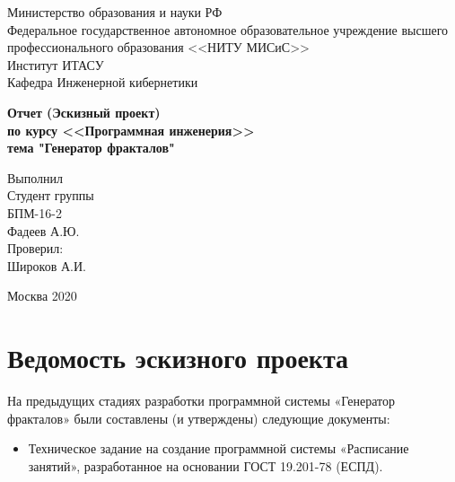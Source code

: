 \documentclass[a4paper,12pt,preview]{report} %
\begin{document}
	
	\begin{center}
		Министерство образования и науки РФ \\
		Федеральное государственное автономное образовательное учреждение высшего профессионального образования <<НИТУ МИСиС>>\\
		Институт ИТАСУ\\
		Кафедра Инженерной кибернетики\\
	\end{center}
	
	
	\vfill
	
	\begin{center}
		\Large\textbf{Отчет  (Эскизный проект) \\
			по курсу <<Программная инженерия>>\\
			тема "Генератор фракталов"}
	\end{center}
	
	\vfill
	
	\begin{FlushRight}
		Выполнил\\
		Студент группы \\
		БПМ-16-2 \\
		Фадеев А.Ю. \\
		[\baselineskip]
		Проверил: \\
		Широков А.И. \\
		[9\baselineskip]
	\end{FlushRight}
	
	
	\begin{center}
		Москва 2020
	\end{center}
	
	\thispagestyle{empty}
	\newpage
	
	\tableofcontents
	\newpage
	
	
	\section*{Ведомость эскизного проекта}
	
	
	На предыдущих стадиях разработки программной системы «Генератор фракталов» были составлены (и утверждены) следующие документы:
	
	\begin{itemize}
		\item Техническое задание на создание программной системы «Расписание занятий», разработанное на основании ГОСТ 19.201-78 (ЕСПД).
	\end{itemize}
	
\end{document}
